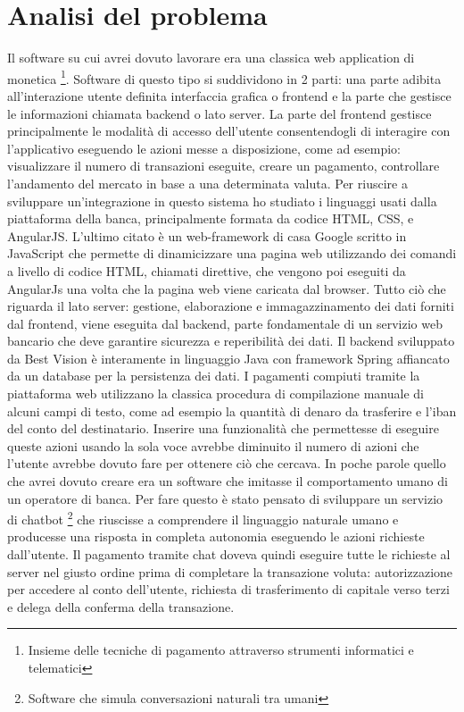 \section{Analisi del problema}
Il software su cui avrei dovuto lavorare era una classica web application di monetica \footnote{Insieme delle tecniche di pagamento attraverso strumenti informatici e telematici}. Software di questo tipo si suddividono in 2 parti: una parte adibita all'interazione utente definita interfaccia grafica o frontend e la parte che gestisce le informazioni chiamata backend o lato server.
La parte del frontend gestisce principalmente le modalità di accesso dell'utente consentendogli di interagire con l'applicativo eseguendo le azioni messe a disposizione, come ad esempio: visualizzare il numero di transazioni eseguite, creare un pagamento, controllare l'andamento del mercato in base a una determinata valuta.
Per riuscire a sviluppare un'integrazione in questo sistema ho studiato i linguaggi usati dalla piattaforma della banca, principalmente formata da codice HTML, CSS, e AngularJS.
L'ultimo citato è un web-framework di casa Google scritto in JavaScript che permette di dinamicizzare una pagina web utilizzando dei comandi a livello di codice HTML, chiamati direttive, che vengono poi eseguiti da AngularJs una volta che la pagina web viene caricata dal browser.
Tutto ciò che riguarda il lato server: gestione, elaborazione e immagazzinamento dei dati forniti dal frontend, viene eseguita dal backend, parte fondamentale di un servizio web bancario che deve garantire sicurezza e reperibilità dei dati. Il backend sviluppato da Best Vision è interamente in linguaggio Java con framework Spring affiancato da un database per la persistenza dei dati.
I pagamenti compiuti tramite la piattaforma web utilizzano la classica procedura di compilazione manuale di alcuni campi di testo, come ad esempio la quantità di denaro da trasferire e l'iban del conto del destinatario.
Inserire una funzionalità che permettesse di eseguire queste azioni usando la sola voce avrebbe diminuito il numero di azioni che l'utente avrebbe dovuto fare per ottenere ciò che cercava. In poche parole quello che avrei dovuto creare era un software che imitasse il comportamento umano di un operatore di banca. Per fare questo è stato pensato di sviluppare un servizio di chatbot \footnote{Software che simula conversazioni naturali tra umani} che riuscisse a comprendere il linguaggio naturale umano e producesse una risposta in completa autonomia eseguendo le azioni richieste dall'utente.
Il pagamento tramite chat doveva quindi eseguire tutte le richieste al server nel giusto ordine prima di completare la transazione voluta: autorizzazione per accedere al conto dell'utente, richiesta di trasferimento di capitale verso terzi e delega della conferma della transazione.
